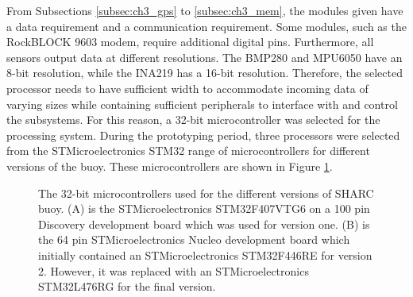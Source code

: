 From Subsections \ref{subsec:ch3_gps} to \ref{subsec:ch3_mem}, the modules given have a data requirement and a communication requirement. Some modules, such as the RockBLOCK 9603 modem, require additional digital pins. Furthermore, all sensors output data at different resolutions. The BMP280 and MPU6050 have an 8-bit resolution, while the INA219 has a 16-bit resolution. Therefore, the selected processor needs to have sufficient width to accommodate incoming data of varying sizes while containing sufficient peripherals to interface with and control the subsystems. For this reason, a 32-bit microcontroller was selected for the processing system. During the prototyping period, three processors were selected from the STMicroelectronics STM32 range of microcontrollers for different versions of the buoy. These microcontrollers are shown in Figure \ref{fig:mcus}.


\begin{figure}[H]
	\centering
	\begin{subfigure}[t]{.5\textwidth}
	\end{subfigure}
	\hfill
	\begin{subfigure}[t]{.49\textwidth}
	\end{subfigure}
	\hfill
	\caption{The 32-bit microcontrollers used for the different versions of SHARC buoy. (A) is the STMicroelectronics STM32F407VTG6 \cite{stmdisc} on a 100 pin Discovery development board which was used for version one. (B) is the 64 pin STMicroelectronics Nucleo development board which initially contained an STMicroelectronics STM32F446RE \cite{stm32nucleo} for version 2. However, it was replaced with an STMicroelectronics STM32L476RG \cite{stm32l4} for the final version.}
	\label{fig:mcus}
\end{figure}

